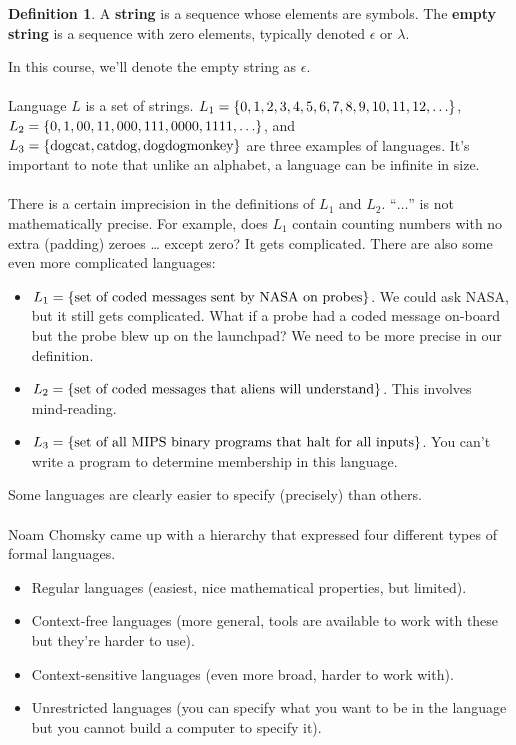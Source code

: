 \documentclass[]{article}
\DeclarePairedDelimiter{\set}{\lbrace}{\rbrace}
\theoremstyle{definition}
\newtheorem*{defn}{Definition}
\begin{document}
		\begin{defn}
			A \textbf{string} is a sequence whose elements are symbols. The \textbf{empty string} is a sequence with zero elements, typically denoted $\epsilon$ or $\lambda$.
		\end{defn}
		In this course, we'll denote the empty string as $\epsilon$.
		\\ \\
		Language $L$ is a set of strings. $L_1 = \set{0, 1, 2, 3, 4, 5, 6, 7, 8, 9, 10, 11, 12, \ldots}$, $L_2 = \set{0, 1, 00, 11, 000, 111, 0000, 1111, \ldots}$, and $L_3 = \set{\text{dogcat}, \text{catdog}, \text{dogdogmonkey}}$ are three examples of languages. It's important to note that unlike an alphabet, a language can be infinite in size.
		\\ \\
		There is a certain imprecision in the definitions of $L_1$ and $L_2$. ``$\ldots$'' is not mathematically precise. For example, does $L_1$ contain counting numbers with no extra (padding) zeroes \ldots{} except zero? It gets complicated. There are also some even more complicated languages:
		\begin{itemize}
			\item $L_1 = \set{\text{set of coded messages sent by NASA on probes}}$. We could ask NASA, but it still gets complicated. What if a probe had a coded message on-board but the probe blew up on the launchpad? We need to be more precise in our definition.
			\item $L_2 = \set{\text{set of coded messages that aliens will understand}}$. This involves mind-reading.
			\item $L_3 = \set{\text{set of all MIPS binary programs that halt for all inputs}}$. You can't write a program to determine membership in this language.
		\end{itemize}
		Some languages are clearly easier to specify (precisely) than others.
		\\ \\	
		Noam Chomsky came up with a hierarchy that expressed four different types of formal languages.
		\begin{itemize}
			\item Regular languages (easiest, nice mathematical properties, but limited).
			\item Context-free languages (more general, tools are available to work with these but they're harder to use).
			\item Context-sensitive languages (even more broad, harder to work with).
			\item Unrestricted languages (you can specify what you want to be in the language but you cannot build a computer to specify it).
		\end{itemize}
\end{document}
